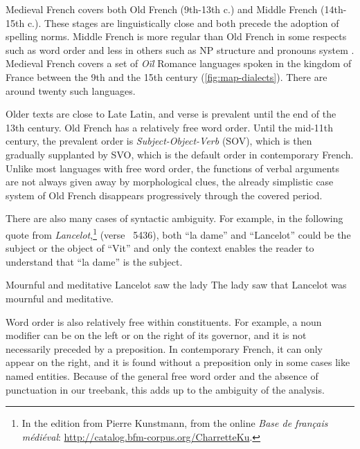 Medieval French covers both Old French (9th-13th c.) and Middle French (14th-15th c.). These stages are linguistically close and both precede the adoption of spelling norms. Middle French is more regular than Old French in some respects such as word order \citep{marchello-Nizia-etal-2020-grande} and less in others such as NP structure and pronouns system \citep{marchello-nizia-etal-1979-histoire}. Medieval French covers a set of \textit{Oïl} Romance languages spoken in the kingdom of France between the 9th and the 15th century (\cref{fig:map-dialects}).
There are around twenty such languages.

Older texts are close to Late Latin, and verse is prevalent until the end of the 13th century. Old French has a relatively free word order.
Until the mid-11th century, the prevalent order is \textit{Subject-Object-Verb} (SOV), which is then gradually supplanted by SVO, which is the default order in contemporary French.
Unlike most languages with free word order, the functions of verbal arguments are not always given away by morphological clues, the already simplistic %
case system of Old French disappears progressively through the covered period.

There are also many cases of syntactic ambiguity. For example, in the following quote from \emph{Lancelot},\footnote{In the edition from Pierre Kunstmann, from the online \textit{Base de français médiéval}: \url{http://catalog.bfm-corpus.org/CharretteKu}.} (verse ~5436),
both \enquote{la dame} and \enquote{Lancelot} could be the subject or the object of \enquote{Vit} and only the context enables the reader to understand that \enquote{la dame} is the subject.

{Mournful and meditative Lancelot saw the lady}
{The lady saw that Lancelot was mournful and meditative.}

Word order is also relatively free within constituents. For example, a noun modifier can be on the left or on the right of its governor, and it is not necessarily preceded by a preposition. In contemporary French, it can only appear on the right, and it is found without a preposition only in some cases like named entities. Because of the general free word order and the absence of punctuation in our treebank, this adds up to the ambiguity of the analysis.

